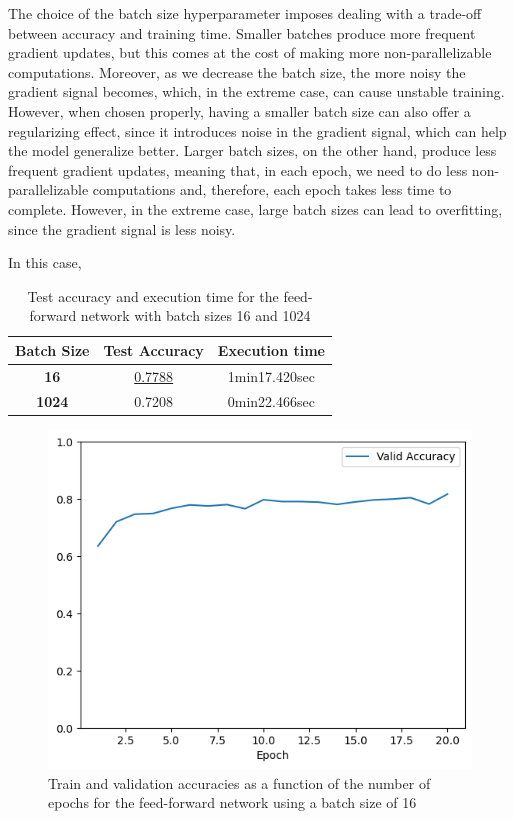 \documentclass[12pt]{article}
\begin{document}
\begin{itemize}
        The choice of the batch size hyperparameter imposes dealing with a trade-off between accuracy and training time. Smaller batches produce more frequent gradient updates, but this comes at the cost of making more non-parallelizable computations. Moreover, as we decrease the batch size, the more noisy the gradient signal becomes, which, in the extreme case, can cause unstable training. However, when chosen properly, having a smaller batch size can also offer a regularizing effect, since it introduces noise in the gradient signal, which can help the model generalize better. Larger batch sizes, on the other hand, produce less frequent gradient updates, meaning that, in each epoch, we need to do less non-parallelizable computations and, therefore, each epoch takes less time to complete. However, in the extreme case, large batch sizes can lead to overfitting, since the gradient signal is less noisy. 

        In this case,

        \begin{table}[H]
            \centering
            \begin{tabular}{|c|cc|}
                \toprule
                \textbf{Batch Size} & \textbf{Test Accuracy} & \textbf{Execution time} \\
                \midrule
                \textbf{16}         & \underline{0.7788}     & 1min17.420sec           \\
                \textbf{1024}       & 0.7208                 & 0min22.466sec           \\
                \bottomrule
            \end{tabular}
            \caption{Test accuracy and execution time for the feed-forward network with batch sizes 16 and 1024}
            \label{tab:2.2a}
        \end{table}

        \begin{figure}[H]
            \centering
            \includegraphics[width=0.5\linewidth]{../outputs/hw1-q2-2a-acc-16.png}
            \caption{Train and validation accuracies as a function of the number of epochs for the feed-forward network using a batch size of 16}
            \label{fig:2.2a:acc:16}
        \end{figure}


\end{itemize}
\end{document}
